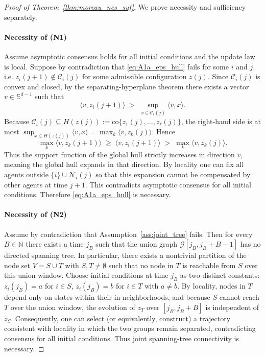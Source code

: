 \documentclass[10pt,a4paper]{amsart}
\def\Cij{\mathcal{C}_i (j)}
\def\co{\mathrm{co}}
\begin{document}
\begin{proof}[Proof of Theorem~\ref{thm:moreau_nes_suf}]
We prove necessity and sufficiency separately.

\paragraph{Necessity of (N1)}
Assume asymptotic consensus holds for all initial conditions and the update law is local.
Suppose by contradiction that \eqref{eq:A1a_eps_hull} fails for some $i$ and $j$, i.e.
$z_i(j+1)\notin \Cij$ for some admissible configuration $z(j)$.
Since $\Cij$ is convex and closed, by the separating-hyperplane theorem there exists a vector
$v\in\mathbb S^{d-1}$ such that
\[
\langle v, z_i(j+1)\rangle \;>\; \sup_{x\in \Cij} \langle v,x\rangle.
\]
Because $\Cij\subseteq H(z(j)):=\co\{z_1(j),\dots,z_\ell(j)\}$, the right-hand side is at most
$\sup_{x\in H(z(j))}\langle v,x\rangle = \max_k \langle v,z_k(j)\rangle$. Hence
\[
\max_k \langle v,z_k(j+1)\rangle \;\ge\; \langle v,z_i(j+1)\rangle
\;>\; \max_k \langle v,z_k(j)\rangle.
\]
Thus the support function of the global hull strictly increases in direction $v$, meaning the global hull
expands in that direction. By locality one can fix all agents outside $\{i\}\cup\mathcal N_i(j)$ so that this
expansion cannot be compensated by other agents at time $j+1$. This contradicts asymptotic consensus for all
initial conditions. Therefore \eqref{eq:A1a_eps_hull} is necessary.

\paragraph{Necessity of (N2)}
Assume by contradiction that Assumption~\ref{ass:joint_tree} fails. Then for every $B\in\mathbb N$ there exists
a time $j_B$ such that the union graph $\mathcal G[j_B,j_B+B-1]$ has no directed spanning tree. In particular,
there exists a nontrivial partition of the node set $V=S\cup T$ with $S,T\neq\emptyset$ such that no node in $T$
is reachable from $S$ over this union window. Choose initial conditions at time $j_B$ as two distinct constants:
$z_i(j_B)=a$ for $i\in S$, $z_i(j_B)=b$ for $i\in T$ with $a\neq b$. By locality, nodes in $T$ depend only on
states within their in-neighborhoods, and because $S$ cannot reach $T$ over the union window, the evolution of
$z_T$ over $[j_B,j_B+B]$ is independent of $z_S$. Consequently, one can select (or equivalently, construct) a
trajectory consistent with locality in which the two groups remain separated, contradicting consensus for all
initial conditions. Thus joint spanning-tree connectivity is necessary.


\end{proof}
\end{document}
